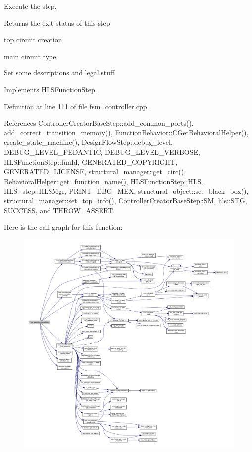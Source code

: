 Execute the step. 

\begin{DoxyReturn}{Returns}
the exit status of this step 
\end{DoxyReturn}
top circuit creation

main circuit type

Set some descriptions and legal stuff 

Implements \hyperlink{classHLSFunctionStep_a8db4c00d080655984d98143206fc9fa8}{H\+L\+S\+Function\+Step}.



Definition at line 111 of file fsm\+\_\+controller.\+cpp.



References Controller\+Creator\+Base\+Step\+::add\+\_\+common\+\_\+ports(), add\+\_\+correct\+\_\+transition\+\_\+memory(), Function\+Behavior\+::\+C\+Get\+Behavioral\+Helper(), create\+\_\+state\+\_\+machine(), Design\+Flow\+Step\+::debug\+\_\+level, D\+E\+B\+U\+G\+\_\+\+L\+E\+V\+E\+L\+\_\+\+P\+E\+D\+A\+N\+T\+IC, D\+E\+B\+U\+G\+\_\+\+L\+E\+V\+E\+L\+\_\+\+V\+E\+R\+B\+O\+SE, H\+L\+S\+Function\+Step\+::fun\+Id, G\+E\+N\+E\+R\+A\+T\+E\+D\+\_\+\+C\+O\+P\+Y\+R\+I\+G\+HT, G\+E\+N\+E\+R\+A\+T\+E\+D\+\_\+\+L\+I\+C\+E\+N\+SE, structural\+\_\+manager\+::get\+\_\+circ(), Behavioral\+Helper\+::get\+\_\+function\+\_\+name(), H\+L\+S\+Function\+Step\+::\+H\+LS, H\+L\+S\+\_\+step\+::\+H\+L\+S\+Mgr, P\+R\+I\+N\+T\+\_\+\+D\+B\+G\+\_\+\+M\+EX, structural\+\_\+object\+::set\+\_\+black\+\_\+box(), structural\+\_\+manager\+::set\+\_\+top\+\_\+info(), Controller\+Creator\+Base\+Step\+::\+SM, hls\+::\+S\+TG, S\+U\+C\+C\+E\+SS, and T\+H\+R\+O\+W\+\_\+\+A\+S\+S\+E\+RT.

Here is the call graph for this function\+:
\nopagebreak
\begin{figure}[H]
\begin{center}
\leavevmode
\includegraphics[width=350pt]{da/d3d/classfsm__controller_a7fd76ef3d980cdcc8451bfd2e3ea3537_cgraph}
\end{center}
\end{figure}


